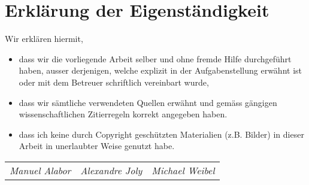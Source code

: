 \chapter*{Erklärung der Eigenständigkeit}

Wir erklären hiermit, 

\begin{itemize}
	\item dass wir die vorliegende Arbeit selber und ohne fremde Hilfe durchgeführt haben, ausser derjenigen, welche explizit in der Aufgabenstellung erwähnt ist oder mit dem Betreuer schriftlich vereinbart wurde,
	\item dass wir sämtliche verwendeten Quellen erwähnt und gemäss gängigen wissenschaftlichen Zitierregeln korrekt angegeben haben.
	\item dass ich keine durch Copyright geschützten Materialien (z.B. Bilder) in dieser Arbeit in unerlaubter Weise genutzt habe.
\end{itemize}


\vspace*{5cm}

\begin{table}[H]
\begin{tabularx}{\textwidth}{X X X}
	\sffamily\textit{Manuel Alabor} &
	\centering\sffamily\textit{Alexandre Joly} &
	\hfill\sffamily\textit{Michael Weibel}
	\tabularnewline
\end{tabularx}
\end{table}